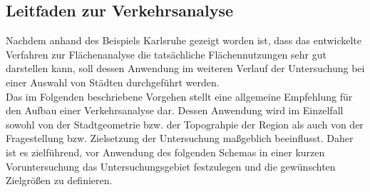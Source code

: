 \subsection{Leitfaden zur Verkehrsanalyse}
Nachdem anhand des Beispiels Karlsruhe gezeigt worden ist, dass das entwickelte Verfahren zur Flächenanalyse die tatsächliche Flächennutzungen sehr gut darstellen kann, soll dessen Anwendung im weiteren Verlauf der Untersuchung bei einer Auswahl von Städten durchgeführt werden.\\
\newline
Das im Folgenden beschriebene Vorgehen stellt eine allgemeine Empfehlung für den Aufbau einer Verkehrsanalyse dar. Dessen Anwendung wird im Einzelfall sowohl von der Stadtgeometrie bzw. der Topograhpie der Region als auch von der Fragestellung bzw. Zielsetzung der Untersuchung maßgeblich beeinflusst. Daher ist es zielführend, vor Anwendung des folgenden Schemas in einer kurzen Voruntersuchung das Untersuchungsgebiet festzulegen und die gewünschten Zielgrößen zu definieren.
